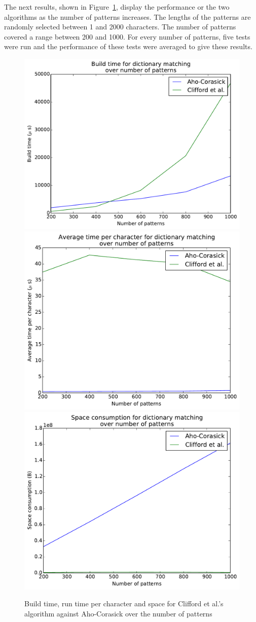 \documentclass[ %
                    author={Dominic Joseph Moylett},
                    degree={MEng},
                     title={Dictionary Matching with Fingerprints},
                  subtitle={An Empirical Analysis},
                      type={research},
                      year={2015} ]{dissertation}
\begin{document}
The next results, shown in Figure~\ref{fig:many-pattern-results}, display the performance or the two algorithms as the number of patterns increases. The lengths of the patterns are randomly selected between 1 and 2000 characters. The number of patterns covered a range between 200 and 1000. For every number of patterns, five tests were run and the performance of these tests were averaged to give these results.

\begin{figure}[t]
\begin{center}
  \includegraphics[width=0.5\linewidth]{build_num_200_1000}\\
  \includegraphics[width=0.5\linewidth]{time_num_200_1000}\includegraphics[width=0.5\linewidth]{size_num_200_1000}
\end{center}
\caption{Build time, run time per character and space for Clifford et al.'s algorithm against Aho-Corasick over the number of patterns}
\label{fig:many-pattern-results}
\end{figure}
\end{document}

